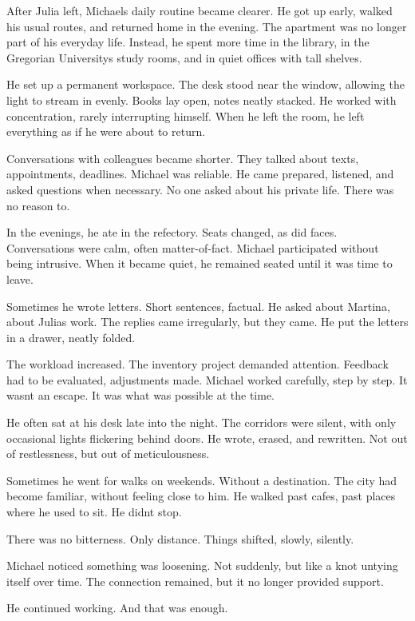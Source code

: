 \documentclass[
]{article}
\begin{document}
After Julia left, Michael\textquotesingle s daily routine became clearer. He got up early, walked his usual routes, and returned home in the evening. The apartment was no longer part of his everyday life. Instead, he spent more time in the library, in the Gregorian University\textquotesingle s study rooms, and in quiet offices with tall shelves.

He set up a permanent workspace. The desk stood near the window, allowing the light to stream in evenly. Books lay open, notes neatly stacked. He worked with concentration, rarely interrupting himself. When he left the room, he left everything as if he were about to return.

Conversations with colleagues became shorter. They talked about texts, appointments, deadlines. Michael was reliable. He came prepared, listened, and asked questions when necessary. No one asked about his private life. There was no reason to.

In the evenings, he ate in the refectory. Seats changed, as did faces. Conversations were calm, often matter-of-fact. Michael participated without being intrusive. When it became quiet, he remained seated until it was time to leave.

Sometimes he wrote letters. Short sentences, factual. He asked about Martina, about Julia\textquotesingle s work. The replies came irregularly, but they came. He put the letters in a drawer, neatly folded.

The workload increased. The inventory project demanded attention. Feedback had to be evaluated, adjustments made. Michael worked carefully, step by step. It wasn\textquotesingle t an escape. It was what was possible at the time.

He often sat at his desk late into the night. The corridors were silent, with only occasional lights flickering behind doors. He wrote, erased, and rewritten. Not out of restlessness, but out of meticulousness.

Sometimes he went for walks on weekends. Without a destination. The city had become familiar, without feeling close to him. He walked past cafes, past places where he used to sit. He didn\textquotesingle t stop.

There was no bitterness. Only distance. Things shifted, slowly, silently.

Michael noticed something was loosening. Not suddenly, but like a knot untying itself over time. The connection remained, but it no longer provided support.

He continued working. And that was enough.
\end{document}
